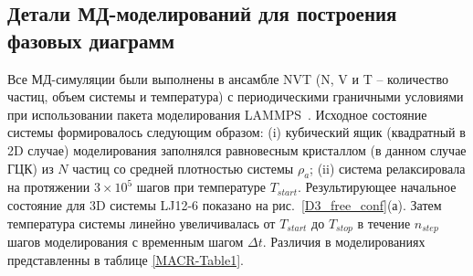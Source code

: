 \subsection{Детали МД-моделирований для построения фазовых диаграмм}
\label{PRIMe-SubSecPhaseDiagramMD}



Все МД-симуляции были выполнены в ансамбле NVT (N, V и T -- количество частиц, объем системы и температура) с периодическими граничными условиями при использовании пакета моделирования LAMMPS~\cite{10.1006/jcph.1995.1039}.
Исходное состояние системы формировалось следующим образом: (i) кубический ящик (квадратный в 2D случае) моделирования заполнялся равновесным кристаллом (в данном случае ГЦК) из $N$ частиц со средней плотностью системы $\rho_a$; (ii) система релаксировала на протяжении $3 \times 10^5$ шагов при температуре $T_{start}$.
Результирующее начальное состояние для 3D системы LJ12-6 показано на рис.~\ref{D3_free_conf}(а).
Затем температура системы линейно увеличивалась от $T_{start}$ до $T_{stop}$ в течение $n_{step}$ шагов моделирования с временным шагом $\Delta t$.
Различия в моделированиях представленны в таблице \ref{MACR-Table1}.


\begin{table}[h!]
  \caption{Параметры, используемые в МД-моделировании для бимодальных расчетов:
    где $\rho$ — средняя плотность системы, $r_c$ — радиус отсечки,
    $T_{start}$ и $T_{stop}$ — начальная и конечная температуры моделирования,
    $n_{step}$ — количество шагов моделирования, а
    $\Delta t$ — временной шаг.}
  \label{MACR-Table1}
\end{table}


